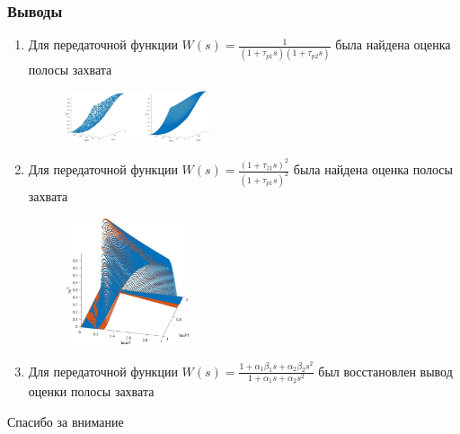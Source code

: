\documentclass{beamer}
\begin{document}
\begin{frame}
\frametitle{Выводы}
\begin{enumerate}
\item Для передаточной функции $W(s) = \frac{1}{(1+\tau_{p1}s)(1+\tau_{p2}s)}$
была найдена оценка полосы захвата
\begin{figure}[H] 
  \includegraphics[width=0.4\textwidth]{images/agregated.eps}
\end{figure}
\item Для передаточной функции $W(s) = \frac{(1+\tau_{z1}s)^2}{(1+\tau_{p1}s)^2}$
была найдена оценка полосы захвата
\begin{figure}[H] 
  \includegraphics[width=0.35\textwidth]{images/main.eps}
\end{figure}
\item Для передаточной функции $W(s) = \frac{1+\alpha_1\beta_1s + \alpha_2\beta_2s^2}{1+\alpha_1s + \alpha_2s^2}$ был восстановлен вывод оценки полосы захвата
\end{enumerate}
\end{frame}


\begin{frame}
\Huge{\centerline{Спасибо за внимание}}
\end{frame}

\end{document}
